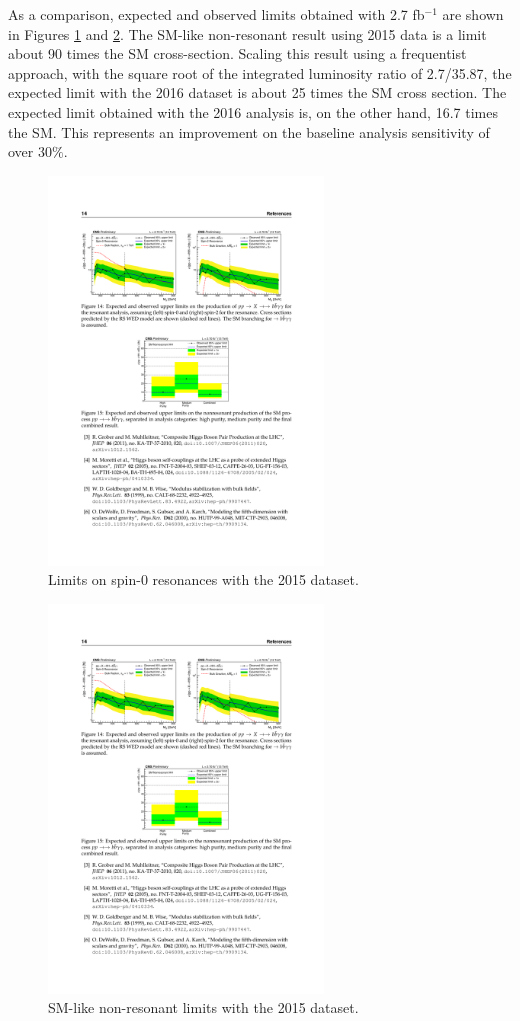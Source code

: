 As a comparison, expected and observed limits obtained with 2.7 fb$^{-1}$ are shown in Figures \ref{fig:result_radion_2015} and \ref{fig:nonres_2015}. 
The SM-like non-resonant result using 2015 data is a limit about 90 times the SM cross-section.  Scaling this result using a frequentist approach, with the square root of the integrated luminosity ratio of 2.7/35.87, the expected limit with the 2016 dataset is about 25 times the SM cross section. 
The expected limit obtained with the 2016 analysis is, on the other hand, 16.7 times the SM. This represents an improvement on the baseline analysis sensitivity of over $30\%$. 

\begin{figure}[h]
  \centering
  \includegraphics[width=0.65\textwidth]{figures/sec-results/LimsRadionLMHM_2015.pdf}\hfil
  \caption{Limits on spin-0 resonances with the 2015 dataset.}
  \label{fig:result_radion_2015}
\end{figure}

\begin{figure}[h]
  \centering
  \includegraphics[width=0.65\textwidth]{figures/sec-results/NonResSMCats_2015.pdf}\hfil
  \caption{SM-like non-resonant limits with the 2015 dataset.}
  \label{fig:nonres_2015}
\end{figure}

